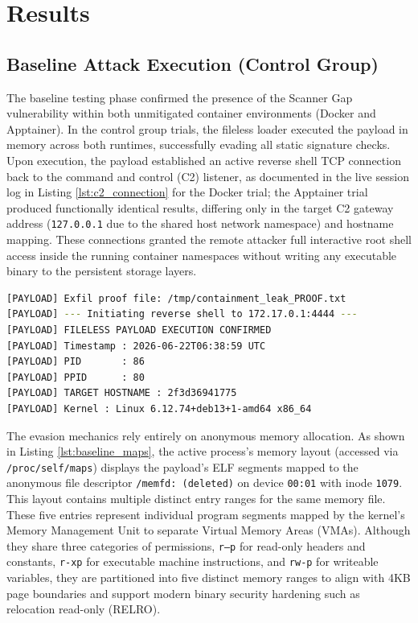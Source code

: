 \section{Results}
\label{sec:results}

%
%

\subsection{Baseline Attack Execution (Control Group)}
The baseline testing phase confirmed the presence of the Scanner Gap vulnerability within both unmitigated container environments (Docker and Apptainer). In the control group trials, the fileless loader executed the payload in memory across both runtimes, successfully evading all static signature checks. Upon execution, the payload established an active reverse shell TCP connection back to the command and control (C2) listener, as documented in the live session log in Listing \ref{lst:c2_connection} for the Docker trial; the Apptainer trial produced functionally identical results, differing only in the target C2 gateway address (\texttt{127.0.0.1} due to the shared host network namespace) and hostname mapping. These connections granted the remote attacker full interactive root shell access inside the running container namespaces without writing any executable binary to the persistent storage layers.


\begin{lstlisting}[language=bash, caption={Terminal output demonstrating successful payload execution and reverse shell connection in Docker.}, label={lst:c2_connection}]
[PAYLOAD] Exfil proof file: /tmp/containment_leak_PROOF.txt
[PAYLOAD] --- Initiating reverse shell to 172.17.0.1:4444 ---
[PAYLOAD] FILELESS PAYLOAD EXECUTION CONFIRMED
[PAYLOAD] Timestamp : 2026-06-22T06:38:59 UTC
[PAYLOAD] PID       : 86
[PAYLOAD] PPID      : 80
[PAYLOAD] TARGET HOSTNAME : 2f3d36941775
[PAYLOAD] Kernel : Linux 6.12.74+deb13+1-amd64 x86_64
\end{lstlisting}

The evasion mechanics rely entirely on anonymous memory allocation. As shown in Listing \ref{lst:baseline_maps}, the active process's memory layout (accessed via \texttt{/proc/self/maps}) displays the payload's ELF segments mapped to the anonymous file descriptor \texttt{/memfd: (deleted)} on device \texttt{00:01} with inode \texttt{1079}. This layout contains multiple distinct entry ranges for the same memory file. These five entries represent individual program segments mapped by the kernel's Memory Management Unit to separate Virtual Memory Areas (VMAs). Although they share three categories of permissions, \texttt{r--p} for read-only headers and constants, \texttt{r-xp} for executable machine instructions, and \texttt{rw-p} for writeable variables, they are partitioned into five distinct memory ranges to align with 4KB page boundaries and support modern binary security hardening such as relocation read-only (RELRO). 

